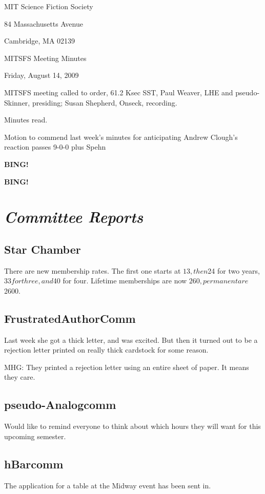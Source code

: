 \documentclass[10pt]{article}
\newcommand{\bing}{{\bf BING!} }
\newcommand{\goto}[1]{\bing \vskip 12pt \section*{{\em{#1}}}}
\newcommand{\ps}{ plus Spehn\xspace}
\begin{document}
\begin{center}

MIT Science Fiction Society

84 Massachusetts Avenue

Cambridge, MA 02139

\vspace{12pt}

MITSFS Meeting Minutes

Friday, August 14, 2009

\end{center}

\vspace{18pt}

\setlength{\parskip}{6pt}

\noindent
MITSFS meeting called to order, 61.2 Ksec SST,
Paul Weaver, LHE and pseudo-Skinner, presiding; Susan Shepherd, Onseck, recording.

Minutes read.

Motion to commend last week's minutes for anticipating Andrew Clough's reaction passes 9-0-0\ps

\bing

\goto{Committee Reports}

\subsection*{Star Chamber}
There are new membership rates. The first one starts at $13, then $24 for two years, $33 for three, and $40 for four. Lifetime memberships are now $260, permanent are $2600.

\subsection*{FrustratedAuthorComm}
Last week she got a thick letter, and was excited. But then it turned out to be a rejection letter printed on really thick cardstock for some reason.

MHG: They printed a rejection letter using an entire sheet of paper. It means they care.

\subsection*{pseudo-Analogcomm}
Would like to remind everyone to think about which hours they will want for this upcoming semester.

\subsection*{hBarcomm}
The application for a table at the Midway event has been sent in.
\end{document}
